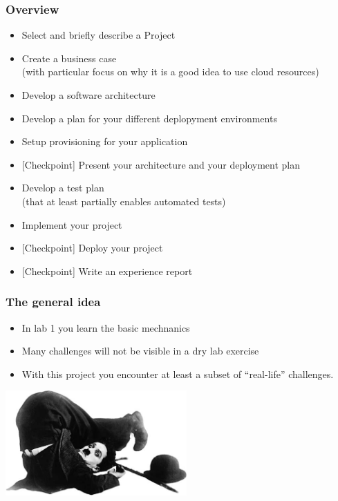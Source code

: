 \documentclass[10pt]{beamer}
\begin{document}
\begin{frame}[t]
\frametitle{Overview}
\begin{itemize}[<+->]
\item Select and briefly describe a Project
\item Create a business case\\
  (with particular focus on why it is a good idea to use cloud resources)
\item Develop a software architecture
\item Develop a plan for your different deplopyment environments
\item Setup provisioning for your application
\item {\color{green} [Checkpoint]} Present your architecture and your deployment plan
\item Develop a test plan\\
  (that at least partially enables automated tests)
\item Implement your project
\item {\color{green} [Checkpoint]} Deploy your project
\item {\color{green} [Checkpoint]} Write an experience report
\end{itemize}
\end{frame}

\begin{frame}[t]
\frametitle{The general idea}
\begin{itemize}
\item In lab 1 you learn the basic mechnanics
\item Many challenges will not be visible in a dry lab exercise
\item With this project you encounter at least a subset of ``real-life'' challenges.
\end{itemize}

\centering
\includegraphics[height=4cm]{Chaplin_Fall.jpg}

\end{frame}
\end{document}

